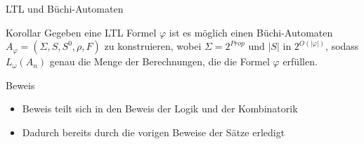 \begin{frame}{LTL und Büchi-Automaten}
\begin{block}{Korollar \cite{vardi+96,vardi+94}}
Gegeben eine LTL Formel $\varphi$ ist es möglich einen Büchi-Automaten $A_{\varphi}=(\Sigma,S, S^0,\rho,F)$ zu konstruieren, wobei $\Sigma=2^{Prop}$ und $|S|$ in $2^{O(|\varphi|)}$, sodass $L_{\omega}(A_n)$ genau die Menge der Berechnungen, die die Formel $\varphi$ erfüllen.
\end{block}
\begin{block}{Beweis}
\begin{itemize}
\setlength\itemsep{1em}
\item Beweis teilt sich in den Beweis der Logik und der Kombinatorik
\item Dadurch bereits durch die vorigen Beweise der Sätze erledigt
\end{itemize}
\end{block}
\end{frame}